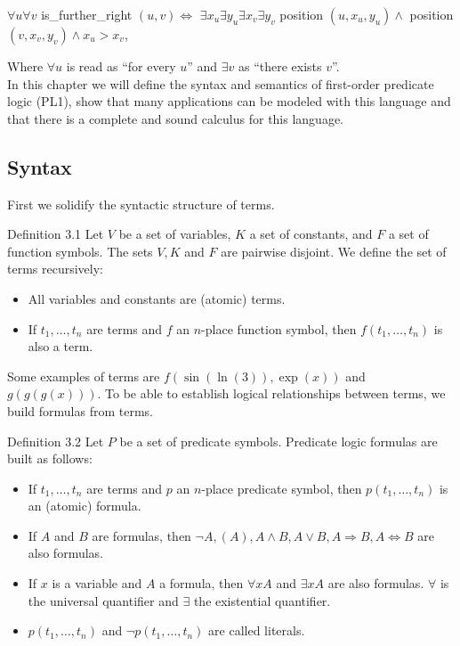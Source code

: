 \documentclass[10pt]{book}
\begin{document}
$\forall u \forall v$ is\_further\_right $(u, v) \Leftrightarrow$
$\exists x_{u} \exists y_{u} \exists x_{v} \exists y_{v}$ position $\left(u, x_{u}, y_{u}\right) \wedge$ position $\left(v, x_{v}, y_{v}\right) \wedge x_{u}>x_{v}$,

Where $\forall u$ is read as ``for every $u$'' and $\exists v$ as ``there exists $v$''.\\
In this chapter we will define the syntax and semantics of first-order predicate logic (PL1), show that many applications can be modeled with this language and that there is a complete and sound calculus for this language.

\subsection{Syntax}
First we solidify the syntactic structure of terms.

Definition 3.1 Let $V$ be a set of variables, $K$ a set of constants, and $F$ a set of function symbols. The sets $V, K$ and $F$ are pairwise disjoint. We define the set of terms recursively:

\begin{itemize}
  \item All variables and constants are (atomic) terms.
  \item If $t_{1}, \ldots, t_{n}$ are terms and $f$ an $n$-place function symbol, then $f\left(t_{1}, \ldots, t_{n}\right)$ is also a term.
\end{itemize}

Some examples of terms are $f(\sin (\ln (3)), \exp (x))$ and $g(g(g(x)))$. To be able to establish logical relationships between terms, we build formulas from terms.

Definition 3.2 Let $P$ be a set of predicate symbols. Predicate logic formulas are built as follows:

\begin{itemize}
  \item If $t_{1}, \ldots, t_{n}$ are terms and $p$ an $n$-place predicate symbol, then $p\left(t_{1}, \ldots, t_{n}\right)$ is an (atomic) formula.
  \item If $A$ and $B$ are formulas, then $\neg A,(A), A \wedge B, A \vee B, A \Rightarrow B, A \Leftrightarrow B$ are also formulas.
  \item If $x$ is a variable and $A$ a formula, then $\forall x A$ and $\exists x A$ are also formulas. $\forall$ is the universal quantifier and $\exists$ the existential quantifier.
  \item $p\left(t_{1}, \ldots, t_{n}\right)$ and $\neg p\left(t_{1}, \ldots, t_{n}\right)$ are called literals.
\end{itemize}
\end{document}
